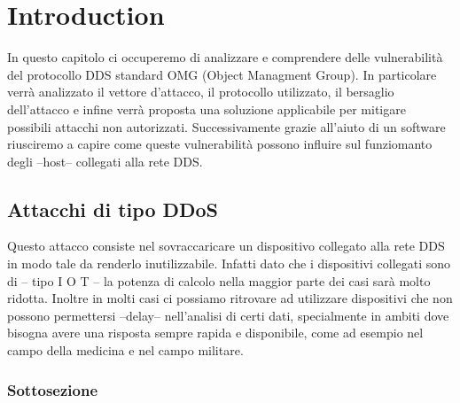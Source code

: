 \chapter{Introduction}


In questo capitolo ci occuperemo di analizzare e comprendere delle vulnerabilità
del protocollo DDS standard OMG (Object Managment Group). In particolare
verrà analizzato il vettore d'attacco, il protocollo utilizzato, il bersaglio
dell'attacco e infine verrà proposta una soluzione applicabile per
mitigare possibili attacchi non autorizzati. Successivamente grazie all'aiuto 
di un software riusciremo a capire come queste vulnerabilità possono 
influire sul funziomanto degli --host-- collegati alla rete DDS.

\section{Attacchi di tipo DDoS}
Questo attacco consiste nel sovraccaricare un dispositivo collegato alla rete DDS
in modo tale da renderlo inutilizzabile. Infatti dato che i dispositivi collegati
sono di -- tipo I O T -- la potenza di calcolo nella maggior parte dei casi sarà
molto ridotta. Inoltre in molti casi ci possiamo ritrovare ad utilizzare dispositivi
che non possono permettersi --delay-- nell'analisi di certi dati, specialmente in
ambiti dove bisogna avere una risposta sempre rapida e disponibile, come ad esempio
nel campo della medicina e nel campo militare.



\subsection{Sottosezione}



\setlength{\arrayrulewidth}{1.0pt} %


